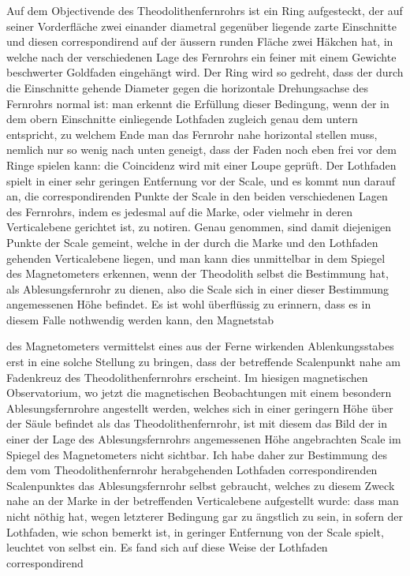 Auf dem Objectivende des Theodolithenfernrohrs ist ein Ring aufgesteckt, der auf seiner Vorderfläche zwei einander diametral gegenüber liegende zarte Einschnitte und diesen correspondirend auf der äussern runden Fläche zwei Häkchen hat, in welche nach der verschiedenen Lage des Fernrohrs ein feiner mit einem Gewichte beschwerter Goldfaden eingehängt wird. Der Ring wird so gedreht, dass der durch die Einschnitte gehende Diameter gegen die horizontale Drehungsachse des Fernrohrs normal ist: man erkennt die Erfüllung dieser Bedingung, wenn der in dem obern Einschnitte einliegende Lothfaden zugleich genau dem untern entspricht, zu welchem Ende man das Fernrohr nahe horizontal stellen muss, nemlich nur so wenig nach unten geneigt, dass der Faden noch eben frei vor dem Ringe spielen kann: die Coincidenz wird mit einer Loupe geprüft. Der Lothfaden spielt in einer sehr geringen Entfernung vor der Scale, und es kommt nun darauf an, die correspondirenden Punkte der Scale in den beiden verschiedenen Lagen des Fernrohrs, indem es jedesmal auf die Marke, oder vielmehr in deren Verticalebene gerichtet ist, zu notiren. Genau genommen, sind damit diejenigen Punkte der Scale gemeint, welche in der durch die Marke und den Lothfaden gehenden Verticalebene liegen, und man kann dies unmittelbar in dem Spiegel des Magnetometers erkennen, wenn der Theodolith selbst die Bestimmung hat, als Ablesungsfernrohr zu dienen, also die Scale sich in einer dieser Bestimmung angemessenen Höhe befindet. Es ist wohl überflüssig zu erinnern, dass es in diesem Falle nothwendig werden kann, den Magnetstab
\par\clearpage
{}
\noindent des Magnetometers vermittelst eines aus der Ferne wirkenden Ablenkungs\-stabes erst in eine solche Stellung zu bringen, dass der betreffende Scalenpunkt nahe am Fadenkreuz des Theodolithenfernrohrs erscheint. Im hiesigen magnetischen Observatorium, wo jetzt die magnetischen Beobachtungen mit einem besondern Ablesungsfernrohre angestellt werden, welches sich in einer geringern Höhe über der Säule befindet als das Theodolithenfernrohr, ist mit diesem das Bild der in einer der Lage des Ablesungsfernrohrs angemessenen Höhe angebrachten Scale im Spiegel des Magnetometers nicht sichtbar. Ich habe daher zur Bestimmung des dem vom Theodolithenfernrohr herabgehenden Lothfaden correspondirenden Scalenpunktes das Ablesungsfernrohr selbst gebraucht, welches zu diesem Zweck nahe an der Marke in der betreffenden Verticalebene aufgestellt wurde: dass man nicht nöthig hat, wegen letzterer Bedingung gar zu ängstlich zu sein, in sofern der Lothfaden, wie schon bemerkt ist, in geringer Entfernung von der Scale spielt, leuchtet von selbst ein. Es fand sich auf diese Weise der Lothfaden correspondirend\par
